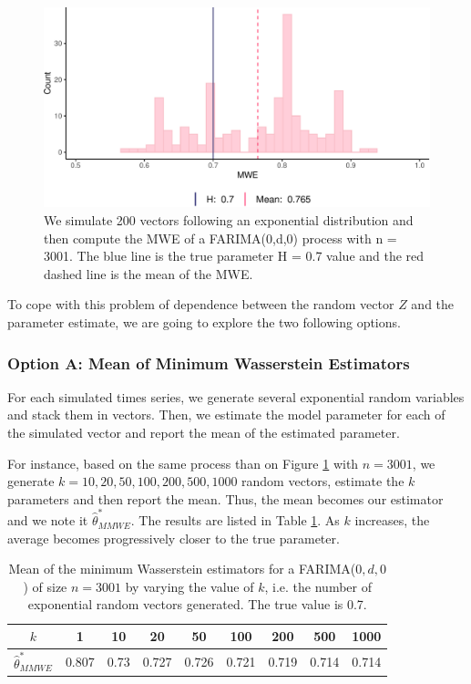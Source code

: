 \documentclass[
  11pt,
]{article}
\begin{document}
\begin{figure}[h]

{\centering \includegraphics[width=0.6\linewidth]{Master_thesis_V5_files/figure-latex/MWE_n-1} 

}

\caption{We simulate 200 vectors following an exponential distribution and then compute the MWE of a FARIMA(0,d,0) process with n = 3001. The blue line is the true parameter H = 0.7 value and the red dashed line is the mean of the MWE.}\label{fig:MWE_n}
\end{figure}

To cope with this problem of dependence between the random vector \(Z\)
and the parameter estimate, we are going to explore the two following
options.

\hypertarget{option-a-mean-of-minimum-wasserstein-estimators}{%
\subsubsection{Option A: Mean of Minimum Wasserstein
Estimators}\label{option-a-mean-of-minimum-wasserstein-estimators}}

For each simulated times series, we generate several exponential random
variables and stack them in vectors. Then, we estimate the model
parameter for each of the simulated vector and report the mean of the
estimated parameter.

For instance, based on the same process than on Figure \ref{fig:MWE_n}
with \(n = 3001\), we generate \(k = 10, 20 , 50, 100 , 200, 500, 1000\)
random vectors, estimate the \(k\) parameters and then report the mean.
Thus, the mean becomes our estimator and we note it
\(\hat \theta^*_{MMWE}\). The results are listed in Table
\ref{tab:MWE_k}. As \(k\) increases, the average becomes progressively
closer to the true parameter.

\begin{table}[h]
\centering
\begin{tabular}{|c|c|c|c|c|c|c|c|c|}
\hline
$k$ &  1 & 10   & 20    & 50    & 100   & 200   & 500   & 1000 \\
\hline
$\hat \theta^*_{MMWE}$ & 0.807 & 0.73 & 0.727 & 0.726 & 0.721 & 0.719 & 0.714 & 0.714 \\
\hline
\end{tabular}
\caption{Mean of the minimum Wasserstein estimators for a FARIMA($0,d,0$) of size $n = 3001$ by varying the value of $k$, i.e. the number of exponential random vectors generated. The true value is 0.7.}
\label{tab:MWE_k}
\end{table}
\end{document}
